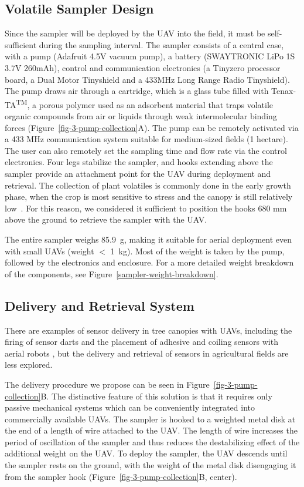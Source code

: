 \subsection{Volatile Sampler Design}
Since the sampler will be deployed by the UAV into the field, it must be self-sufficient during the sampling interval. The sampler consists of a central case, with a pump (Adafruit 4.5V vacuum pump), a battery (SWAYTRONIC LiPo 1S 3.7V 260mAh), control and communication electronics (a Tinyzero processor board, a Dual Motor Tinyshield and a 433MHz Long Range Radio Tinyshield). The pump draws air through a cartridge, which is a glass tube filled with Tenax-TA\textsuperscript{TM}, a porous polymer used as an adsorbent material that traps volatile organic compounds from air or liquids through weak intermolecular binding forces (Figure~\ref{fig-3-pump-collection}A). The pump can be remotely activated via a 433 MHz communication system suitable for medium-sized fields (1 hectare). The user can also remotely set the sampling time and flow rate via the control electronics. Four legs stabilize the sampler, and hooks extending above the sampler provide an attachment point for the UAV during deployment and retrieval. The collection of plant volatiles is commonly done in the early growth phase, when the crop is most sensitive to stress and the canopy is still relatively low~\cite{turlings_tritrophic_2018}. For this reason, we considered it sufficient to position the hooks 680 mm above the ground to retrieve the sampler with the UAV.

The entire sampler weighs 85.9~g, making it suitable for aerial deployment even with small UAVs (weight $<$ 1~kg). Most of the weight is taken by the pump, followed by the electronics and enclosure. For a more detailed weight breakdown of the components, see Figure~\ref{sampler-weight-breakdown}.

\subsection{Delivery and Retrieval System}
There are examples of sensor delivery in tree canopies with UAVs, including the firing of sensor darts \cite{Farinha2020} and the placement of adhesive and coiling sensors with aerial robots \cite{Hamaza2019, Geckeler2022a}, but the delivery and retrieval of sensors in agricultural fields are less explored.

The delivery procedure we propose can be seen in Figure~\ref{fig-3-pump-collection}B. The distinctive feature of this solution is that it requires only passive mechanical systems which can be conveniently integrated into commercially available UAVs. The sampler is hooked to a weighted metal disk at the end of a length of wire attached to the UAV. The length of wire increases the period of oscillation of the sampler and thus reduces the destabilizing effect of the additional weight on the UAV. To deploy the sampler, the UAV descends until the sampler rests on the ground, with the weight of the metal disk disengaging it from the sampler hook (Figure~\ref{fig-3-pump-collection}B, center).


